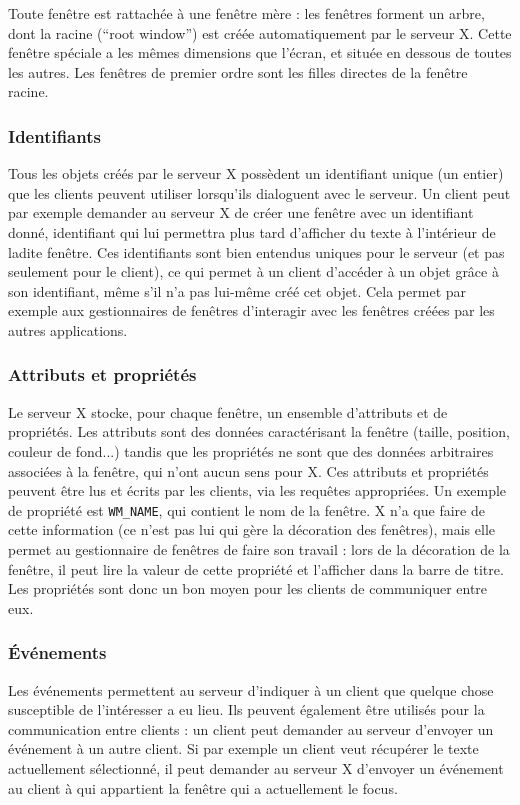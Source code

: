 Toute fenêtre est rattachée à une fenêtre mère : les fenêtres forment un arbre, dont la racine (``root window'') est créée automatiquement par le serveur X. Cette fenêtre spéciale a les mêmes dimensions que l'écran, et située en dessous de toutes les autres. Les fenêtres de premier ordre sont les filles directes de la fenêtre racine.

\subsubsection{Identifiants}
Tous les objets créés par le serveur X possèdent un identifiant unique (un entier) que les clients peuvent utiliser lorsqu'ils dialoguent avec le serveur. Un client peut par exemple demander au serveur X de créer une fenêtre avec un identifiant donné, identifiant qui lui permettra plus tard d'afficher du texte à l'intérieur de ladite fenêtre. Ces identifiants sont bien entendus uniques pour le serveur (et pas seulement pour le client), ce qui permet à un client d'accéder à un objet grâce à son identifiant, même s'il n'a pas lui-même créé cet objet. Cela permet par exemple aux gestionnaires de fenêtres d'interagir avec les fenêtres créées par les autres applications.

\subsubsection{Attributs et propriétés}
Le serveur X stocke, pour chaque fenêtre, un ensemble d'attributs et de propriétés. Les attributs sont des données caractérisant la fenêtre (taille, position, couleur de fond...) tandis que les propriétés ne sont que des données arbitraires associées à la fenêtre, qui n'ont aucun sens pour X. Ces attributs et propriétés peuvent être lus et écrits par les clients, via les requêtes appropriées. Un exemple de propriété est \verb|WM_NAME|, qui contient le nom de la fenêtre. X n'a que faire de cette information (ce n'est pas lui qui gère la décoration des fenêtres), mais elle permet au gestionnaire de fenêtres de faire son travail : lors de la décoration de la fenêtre, il peut lire la valeur de cette propriété et l'afficher dans la barre de titre. Les propriétés sont donc un bon moyen pour les clients de communiquer entre eux.

\subsubsection{Événements}
Les événements permettent au serveur d'indiquer à un client que quelque chose susceptible de l'intéresser a eu lieu. Ils peuvent également être utilisés pour la communication entre clients : un client peut demander au serveur d'envoyer un événement à un autre client. Si par exemple un client veut récupérer le texte actuellement sélectionné, il peut demander au serveur X d'envoyer un événement au client à qui appartient la fenêtre qui a actuellement le focus.

